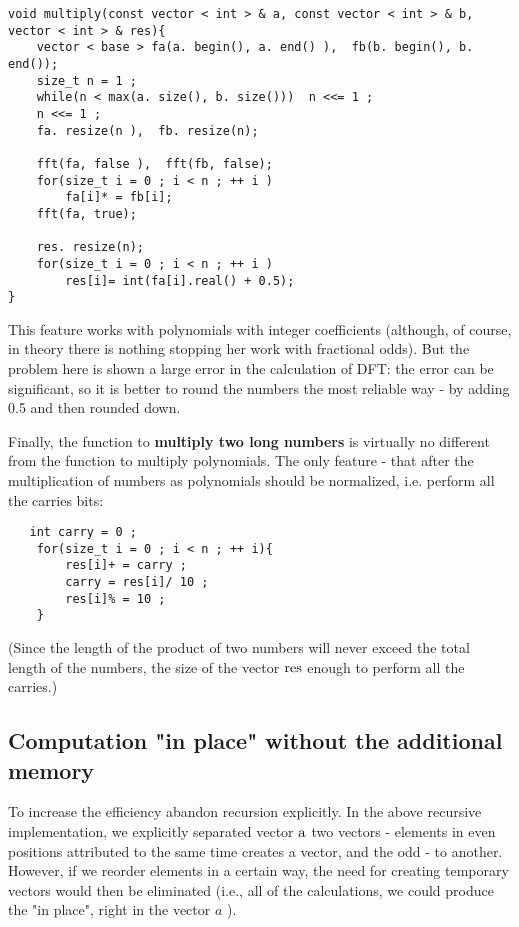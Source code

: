 \begin{verbatim}
void multiply(const vector < int > & a, const vector < int > & b, vector < int > & res){
    vector < base > fa(a. begin(), a. end() ),  fb(b. begin(), b. end());
    size_t n = 1 ;
    while(n < max(a. size(), b. size()))  n <<= 1 ;
    n <<= 1 ;
    fa. resize(n ),  fb. resize(n);
 
    fft(fa, false ),  fft(fb, false);
    for(size_t i = 0 ; i < n ; ++ i )
        fa[i]* = fb[i];
    fft(fa, true);
 
    res. resize(n);
    for(size_t i = 0 ; i < n ; ++ i )
        res[i]= int(fa[i].real() + 0.5);
} 
\end{verbatim}
This feature works with polynomials with integer coefficients (although, of course, in theory there is nothing stopping her work with fractional odds). But the problem here is shown a large error in the calculation of DFT: the error can be significant, so it is better to round the numbers the most reliable way - by adding 0.5 and then rounded down.

Finally, the function to \textbf{multiply two long numbers} is virtually no different from the function to multiply polynomials. The only feature - that after the multiplication of numbers as polynomials should be normalized, i.e. perform all the carries bits:

\begin{verbatim}
   int carry = 0 ;
    for(size_t i = 0 ; i < n ; ++ i){
        res[i]+ = carry ;
        carry = res[i]/ 10 ;
        res[i]% = 10 ;
    } 
\end{verbatim}
(Since the length of the product of two numbers will never exceed the total length of the numbers, the size of the vector $\rm res$ enough to perform all the carries.)

\subsection{ Computation "in place" without the additional memory }

To increase the efficiency abandon recursion explicitly. In the above recursive implementation, we explicitly separated vector $\rm a$ two vectors - elements in even positions attributed to the same time creates a vector, and the odd - to another. However, if we reorder elements in a certain way, the need for creating temporary vectors would then be eliminated (i.e., all of the calculations, we could produce the "in place", right in the vector $a$ ).

